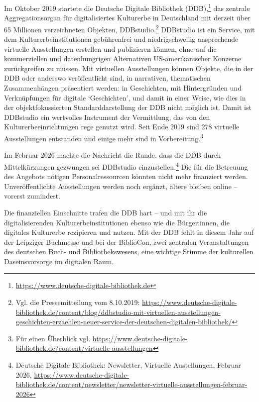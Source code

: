 \documentclass[a4paper,
fontsize=11pt,
oneside,
numbers=noperiodatend,
parskip=half-,
bibliography=totoc,
final
]{scrartcl}
\begin{document}
Im Oktober 2019 startete die Deutsche Digitale Bibliothek
(DDB),\footnote{\url{https://www.deutsche-digitale-bibliothek.de}} das
zentrale Aggregationsorgan für digitalisiertes Kulturerbe in Deutschland
mit derzeit über 65 Millionen verzeichneten Objekten,
DDBstudio.\footnote{Vgl. die Pressemitteilung vom 8.10.2019:
  \url{https://www.deutsche-digitale-bibliothek.de/content/blog/ddbstudio-mit-virtuellen-ausstellungen-geschichten-erzaehlen-neuer-service-der-deutschen-digitalen-bibliothek/}}
DDBstudio ist ein Service, mit dem Kulturerbeinstitutionen gebührenfrei
und niedrigschwellig ansprechende virtuelle Ausstellungen erstellen und
publizieren können, ohne auf die kommerziellen und datenhungrigen
Alternativen US-amerikanischer Konzerne zurückgreifen zu müssen. Mit
virtuellen Ausstellungen können Objekte, die in der DDB oder anderswo
veröffentlicht sind, in narrativen, thematischen Zusammenhängen
präsentiert werden: in Geschichten, mit Hintergründen und Verknüpfungen
für digitale \enquote*{Geschichten}, und damit in einer Weise, wie dies
in der objektfokussierten Standarddarstellung der DDB nicht möglich ist.
Damit ist DDBstudio ein wertvolles Instrument der Vermittlung, das von
den Kulturerbeeinrichtungen rege genutzt wird. Seit Ende 2019 sind 278
virtuelle Ausstellungen entstanden und einige mehr sind in
Vorbereitung.\footnote{Für einen Überblick vgl.
  \url{https://www.deutsche-digitale-bibliothek.de/content/virtuelle-ausstellungen}}

Im Februar 2026 machte die Nachricht die Runde, dass die DDB durch
Mittelkürzungen gezwungen sei DDBstudio einzustellen.\footnote{Deutsche
  Digitale Bibliothek: Newsletter, Virtuelle Austellungen, Februar 2026,
  \url{https://www.deutsche-digitale-bibliothek.de/content/newsletter/newsletter-virtuelle-ausstellungen-februar-2026}}
Die für die Betreuung des Angebots nötigen Personalressourcen könnten
nicht mehr finanziert werden. Unveröffentlichte Ausstellungen werden
noch ergänzt, ältere bleiben online -- vorerst zumindest.

Die finanziellen Einschnitte trafen die DDB hart -- und mit ihr die
digitalisierenden Kulturerbeinstitutionen ebenso wie die Bürger:innen,
die digitales Kulturerbe rezipieren und nutzen. Mit der DDB fehlt in
diesem Jahr auf der Leipziger Buchmesse und bei der BiblioCon, zwei
zentralen Veranstaltungen des deutschen Buch- und Bibliothekswesens,
eine wichtige Stimme der kulturellen Daseinsvorsorge im digitalen Raum.
\end{document}
